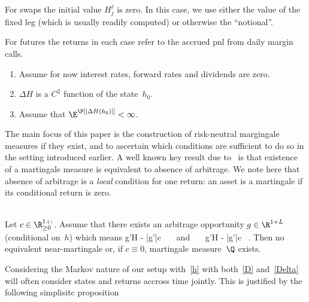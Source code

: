 \documentclass{hbarticle}
\begin{document}
	\begin{remark}
		For swaps the initial value $H_j^\ell$ is zero. In this case, we use either
		the value of the fixed leg (which is usually readily computed) or otherwise
		the ``notional''.	
		
		For futures the returns in each case refer to the accrued pnl from
		daily margin calls.
	\end{remark}


    \begin{assumptions}
    \hspace{1cm}
    	\begin{enumerate}
			\item Assume for now interest rates, 
			forward rates and dividends are zero.
    		\item $ \Delta H$ is a $C^2$ function of the state~$h_0$.
    		\item Assume that $\E^\P[| \Delta H(h_0)| ]<\infty$.
    	\end{enumerate}
    \end{assumptions}

    The main focus of this paper is the construction of risk-neutral margingale measures
    if they exist, and to ascertain which conditions are sufficient to do so in the setting
    introduced earlier. A well known key result due to~\cite{FFTOAP_DT} is 
	that existence of a martingale measure
	is equivalent to absence of arbitrage. We note here that absence of arbitrage
    is a \emph{local} condition for one return: an asset is a martingale if
    its conditional return is zero. 
    
	
	\begin{prop}	
		\hspace{1cm}\\
		Let $c\in\R_{\geq 0}^{1+:}$.
		Assume that there exists an arbitrage
		opportunity $g\in \R^{1+L}$ (conditional on~$h$)
		which means
			g'\Delta H - |g'|c  \ \ \ 
			\mbox{and} \ \ \ g'\Delta H - |g'|c  \ .
		\eqend 	
		Then no equivalent near-martingale or, if $c\equiv0$, martingale measure~$\Q$
		exists.
	\end{prop}



    Considering the Markov nature of our setup with~\eqref{h} with both~\eqref{D} and~\eqref{Delta}
    will often consider states and returns accross time jointly. This is justified by the following
    simplisitc proposition
\end{document}
